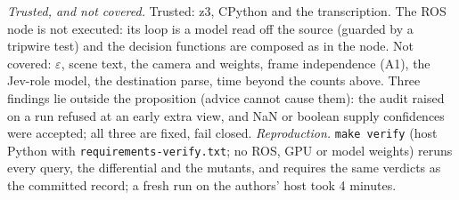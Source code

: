 \emph{Trusted, and not covered.} Trusted: z3, CPython and the transcription. The ROS node is not executed: its loop is a model read off the source (guarded by a tripwire test) and the decision functions are composed as in the node. Not covered: $\varepsilon$, scene text, the camera and weights, frame independence (A1), the Jev-role model, the destination parse, time beyond the counts above. Three findings lie outside the proposition (advice cannot cause them): the audit raised on a run refused at an early extra view, and NaN or boolean supply confidences were accepted; all three are fixed, fail closed. \emph{Reproduction.} \texttt{make verify} (host Python with \texttt{requirements-verify.txt}; no ROS, GPU or model weights) reruns every query, the differential and the mutants, and requires the same verdicts as the committed record; a fresh run on the authors' host took 4 minutes.
